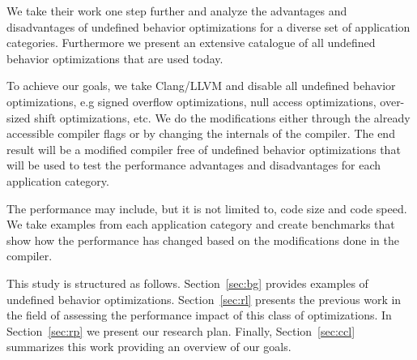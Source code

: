We take their work one step further and analyze the advantages and
disadvantages of undefined behavior optimizations for a diverse set of
application categories. Furthermore we present an extensive catalogue of
all undefined behavior optimizations that are used today.

To achieve our goals, we take Clang/LLVM and disable all undefined
behavior optimizations, e.g signed overflow optimizations, null access
optimizations, over-sized shift optimizations, etc. We do the
modifications either through the already accessible compiler flags or by
changing the internals of the compiler. The end result will be a
modified compiler free of undefined behavior optimizations that will be
used to test the performance advantages and disadvantages for each
application category.

The performance may include, but it is not limited to, code
size and code speed. We take examples from each application category
and create benchmarks that show how the performance has changed based on
the modifications done in the compiler.

This study is structured as follows. Section~\ref{sec:bg} provides
examples of undefined behavior optimizations. Section~\ref{sec:rl}
presents the previous work in the field of assessing the performance
impact of this class of optimizations. In Section~\ref{sec:rp} we
present our research plan. Finally, Section~\ref{sec:ccl} summarizes
this work providing an overview of our goals.
